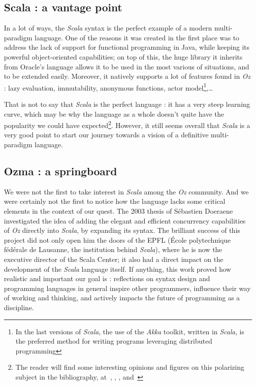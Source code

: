 \subsection{Scala : a vantage point}\label{subsec:ch1-scala}
In a lot of ways, the \textit{Scala} syntax is the perfect example of a modern multi-paradigm language.
One of the reasons it was created in the first place was to address the lack of support for functional programming in Java, while keeping its powerful object-oriented capabilities;
on top of this, the huge library it inherits from Oracle's language allows it to be used in the most various of situations, and to be extended easily.
Moreover, it natively supports a lot of features found in \textit{Oz} : lazy evaluation, immutability, anonymous functions, actor model\footnote{In the last versions of \textit{Scala}, the use of the \textit{Akka} toolkit\cite{akka}, written in \textit{Scala}, is the preferred method for writing programs leveraging distributed programming},\ldots\newline

That is not to say that \textit{Scala} is the perfect language :
it has a very steep learning curve, which may be why the language as a whole doesn't quite have the popularity we could have expected\footnote{The reader will find some interesting opinions and figures on this polarizing subject in the bibliography, at~\cite{scalaOpinion1}, \cite{scalaOpinion2}, \cite{jetbrainsfigures}, and~\cite{tiobeindex}}.
However, it still seems overall that \textit{Scala} is a very good point to start our journey towards a vision of a definitive multi-paradigm language.

\subsection{Ozma : a springboard}\label{subsec:ch1-ozma}
We were not the first to take interest in \textit{Scala} among the \textit{Oz} community.
And we were certainly not the first to notice how the language lacks some critical elements in the context of our quest.
The 2003 thesis of Sébastien Doeraene~\cite{Ozma} investigated the idea of adding the elegant and efficient concurrency capabilities of \textit{Oz} directly into \textit{Scala}, by expanding its syntax.
The brilliant success of this project did not only open him the doors of the EPFL (École polytechnique fédérale de Lausanne, the institution behind \textit{Scala}), where he is now the executive director of the Scala Center;
it also had a direct impact on the development of the \textit{Scala} language itself.
If anything, this work proved how realistic and important our goal is : reflections on syntax design and programming languages in general inspire other programmers, influence their way of working and thinking, and actively impacts the future of programming as a discipline.

